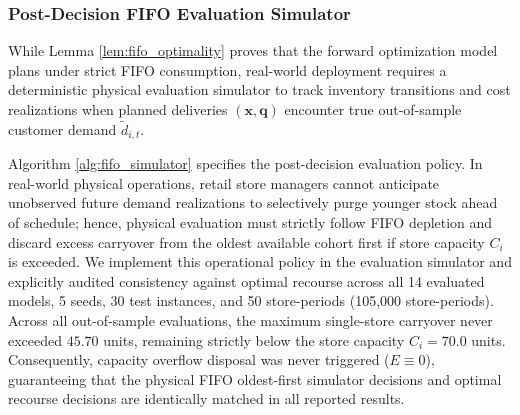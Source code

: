\documentclass[11pt,a4paper]{article}
\theoremstyle{definition}
\theoremstyle{remark}
\begin{document}
\subsubsection{Post-Decision FIFO Evaluation Simulator}
While Lemma \ref{lem:fifo_optimality} proves that the forward optimization model plans under strict FIFO consumption, real-world deployment requires a deterministic physical evaluation simulator to track inventory transitions and cost realizations when planned deliveries $(\mathbf{x}, \mathbf{q})$ encounter true out-of-sample customer demand $\tilde{d}_{i,t}$. 

Algorithm \ref{alg:fifo_simulator} specifies the post-decision evaluation policy. In real-world physical operations, retail store managers cannot anticipate unobserved future demand realizations to selectively purge younger stock ahead of schedule; hence, physical evaluation must strictly follow FIFO depletion and discard excess carryover from the oldest available cohort first if store capacity $C_i$ is exceeded. We implement this operational policy in the evaluation simulator and explicitly audited consistency against optimal recourse across all 14 evaluated models, 5 seeds, 30 test instances, and 50 store-periods (105,000 store-periods). Across all out-of-sample evaluations, the maximum single-store carryover never exceeded $45.70$ units, remaining strictly below the store capacity $C_i = 70.0$ units. Consequently, capacity overflow disposal was never triggered ($E \equiv 0$), guaranteeing that the physical FIFO oldest-first simulator decisions and optimal recourse decisions are identically matched in all reported results.
\end{document}
